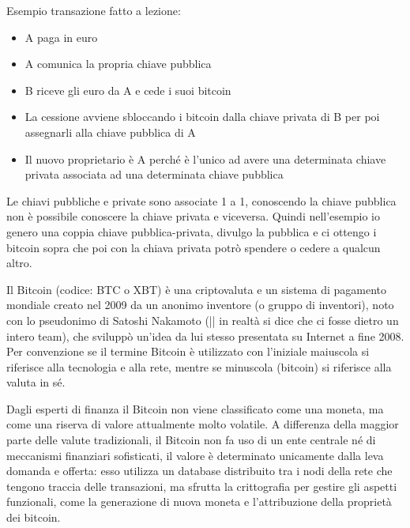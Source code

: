 \singlespacing

Esempio transazione fatto a lezione:

\begin{itemize}
    \item A paga in euro
    
    \item A comunica la propria chiave pubblica
    
    \item B riceve gli euro da A e cede i suoi bitcoin
    
    \item La cessione avviene sbloccando i bitcoin dalla chiave privata di B per poi assegnarli alla chiave pubblica di A
    
    \item Il nuovo proprietario è A perché è l’unico ad avere una determinata chiave privata associata ad una determinata chiave pubblica
\end{itemize}
Le chiavi pubbliche e private sono associate 1 a 1, conoscendo la chiave pubblica non è possibile conoscere la
chiave privata e viceversa.
Quindi nell’esempio io genero una coppia chiave pubblica-privata, divulgo la pubblica e ci ottengo i bitcoin sopra
che poi con la chiava privata potrò spendere o cedere a qualcun altro.

Il Bitcoin (codice: BTC o XBT) è una criptovaluta e un sistema di pagamento mondiale creato
nel 2009 da un anonimo inventore (o gruppo di inventori), noto con lo pseudonimo di Satoshi Nakamoto (|| in
realtà si dice che ci fosse dietro un intero team), che sviluppò un'idea da lui stesso presentata su Internet a
fine 2008. Per convenzione se il termine Bitcoin è utilizzato con l'iniziale maiuscola si riferisce alla tecnologia e
alla rete, mentre se minuscola (bitcoin) si riferisce alla valuta in sé.

\singlespacing

Dagli esperti di finanza il Bitcoin non viene classificato come una moneta, ma come una riserva di valore
attualmente molto volatile. A differenza della maggior parte delle valute tradizionali, il Bitcoin non fa uso di un ente
centrale né di meccanismi finanziari sofisticati, il valore è determinato unicamente dalla leva domanda e offerta:
esso utilizza un database distribuito tra i nodi della rete che tengono traccia delle transazioni, ma sfrutta
la crittografia per gestire gli aspetti funzionali, come la generazione di nuova moneta e l'attribuzione
della proprietà dei bitcoin.

